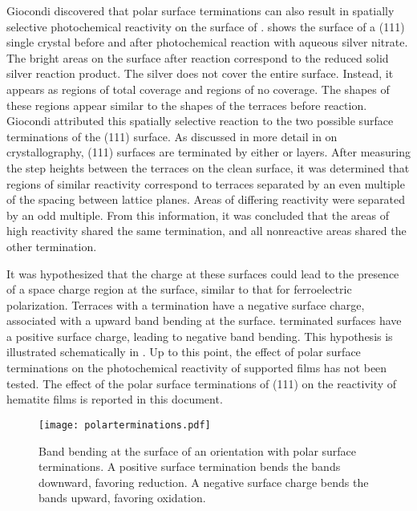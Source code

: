 Giocondi\cite{Giocondi:2003wc} discovered that polar surface terminations can also result
in spatially selective photochemical reactivity on the surface of .
 shows the surface of a (111)  single crystal before and
after photochemical reaction with aqueous silver nitrate. The bright areas on the surface
after reaction correspond to the reduced solid silver reaction product. The silver does
not cover the entire surface. Instead, it appears as regions of total coverage and regions
of no coverage. The shapes of these regions appear similar to the shapes of the terraces
before reaction. Giocondi attributed this spatially selective reaction to the two possible
surface terminations of the (111)  surface. As discussed in more detail in
 on  crystallography, (111) 
surfaces are terminated by either  or  layers. After measuring
the step heights between the terraces on the clean surface, it was determined that regions
of similar reactivity correspond to terraces separated by an even multiple of the spacing
between lattice planes. Areas of differing reactivity were separated by an odd multiple.
From this information, it was concluded that the areas of high reactivity shared the same
termination, and all nonreactive areas shared the other termination.

It was hypothesized that the charge at these surfaces could lead to the presence of a
space charge region at the surface, similar to that for ferroelectric polarization.
Terraces with a  termination have a negative surface charge, associated with
a upward band bending at the surface.  terminated surfaces have a positive
surface charge, leading to negative band bending. This hypothesis is illustrated
schematically in . Up to this point, the effect of polar
surface terminations on the photochemical reactivity of supported films has not been
tested. The effect of the polar surface terminations of (111)  on the
reactivity of hematite films is reported in this document.
\begin{figure}
	\centerline{\texttt{[image: polarterminations.pdf]}}
	\caption[Band bending arising from polar surface terminations]{%
		Band bending at the surface of an orientation with polar surface 
		terminations. A positive surface termination bends the bands 
		downward, favoring reduction. A negative surface charge bends the 
		bands upward, favoring oxidation.}
	\label{fig:polarterminations}
\end{figure}


